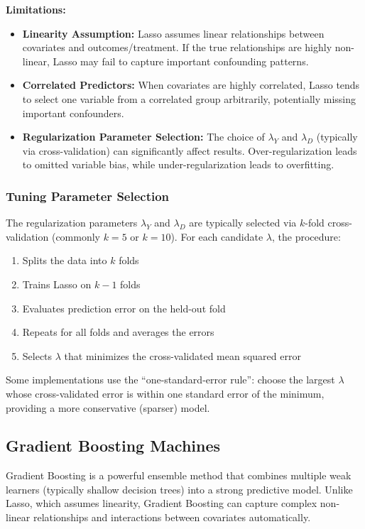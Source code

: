 \documentclass[12pt,a4paper]{article}
\begin{document}
\textbf{Limitations:}
\begin{itemize}
\item \textbf{Linearity Assumption:} Lasso assumes linear relationships between covariates and outcomes/treatment. If the true relationships are highly non-linear, Lasso may fail to capture important confounding patterns.
\item \textbf{Correlated Predictors:} When covariates are highly correlated, Lasso tends to select one variable from a correlated group arbitrarily, potentially missing important confounders.
\item \textbf{Regularization Parameter Selection:} The choice of $\lambda_Y$ and $\lambda_D$ (typically via cross-validation) can significantly affect results. Over-regularization leads to omitted variable bias, while under-regularization leads to overfitting.
\end{itemize}

\subsubsection{Tuning Parameter Selection}

The regularization parameters $\lambda_Y$ and $\lambda_D$ are typically selected via $k$-fold cross-validation (commonly $k=5$ or $k=10$). For each candidate $\lambda$, the procedure:
\begin{enumerate}
\item Splits the data into $k$ folds
\item Trains Lasso on $k-1$ folds
\item Evaluates prediction error on the held-out fold
\item Repeats for all folds and averages the errors
\item Selects $\lambda$ that minimizes the cross-validated mean squared error
\end{enumerate}

Some implementations use the ``one-standard-error rule'': choose the largest $\lambda$ whose cross-validated error is within one standard error of the minimum, providing a more conservative (sparser) model.

\subsection{Gradient Boosting Machines}

Gradient Boosting is a powerful ensemble method that combines multiple weak learners (typically shallow decision trees) into a strong predictive model. Unlike Lasso, which assumes linearity, Gradient Boosting can capture complex non-linear relationships and interactions between covariates automatically.
\end{document}
